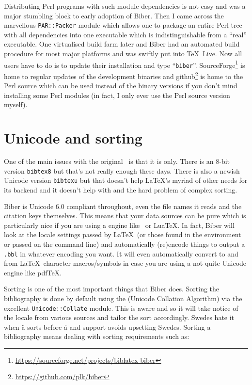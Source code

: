 \documentclass[final]{ltugboat}
\def\BibLaTeX{\Bib\LaTeX}
\begin{document}
Distributing Perl programs with such module dependencies is not easy
and was a major stumbling block to early adoption of Biber. Then I
came across the marvellous \verb|PAR::Packer| module which allows one
to package an entire Perl tree with all dependencies into one
executable which is indistinguishable from a ``real'' executable. One
virtualised build farm later and Biber had an automated build
procedure for most major platforms and was swiftly put into
\TeX{}\ Live. Now all users have to do is to update their 
installation and type ``\verb|biber|''.
SourceForge\footnote{\url{https://sourceforge.net/projects/biblatex-biber}}
is home to regular updates of the development binaries and
github\footnote{\url{https://github.com/plk/biber}} is home to the
Perl source which can be used instead of the binary versions if you
don't mind installing some Perl modules (in fact, I only ever use the
Perl source version myself).

\section{Unicode and sorting}

One of the main issues with the original \BibTeX\ is that it is  only. 
There is an 8-bit version \verb|bibtex8| but that's not really enough these
days. There is also a newish Unicode version \verb|bibtexu| but that
doesn't help \BibLaTeX's myriad of other needs for its backend and it doesn't
help with  and the hard problem of complex sorting.

Biber is Unicode 6.0 compliant throughout, even the file names it reads and
the citation keys themselves. This means that your data sources can be pure
 which is particularly nice if you are using a  engine like
\XeTeX\ or Lua\TeX. In fact, Biber will look at the locale settings passed
by \BibLaTeX\ (or those found in the environment or passed on the command
line) and automatically (re)encode things to output a \verb|.bbl| in
whatever encoding you want. It will even automatically convert  to and
from \LaTeX\ character macros/symbols in case you are using a
not-quite-Unicode engine like pdf\TeX.

Sorting is one of the most important things that Biber does. Sorting the
bibliography is done by default using the  (Unicode Collation Algorithm)
via the excellent \verb|Unicode::Collate| module. This is  aware and so
it will take notice of the locale from various sources and tailor the sort
accordingly. Swedes hate it when \"{a} sorts before \r{a} and  support
avoids upsetting Swedes. Sorting a bibliography means dealing with
sorting requirements such as:
\end{document}
